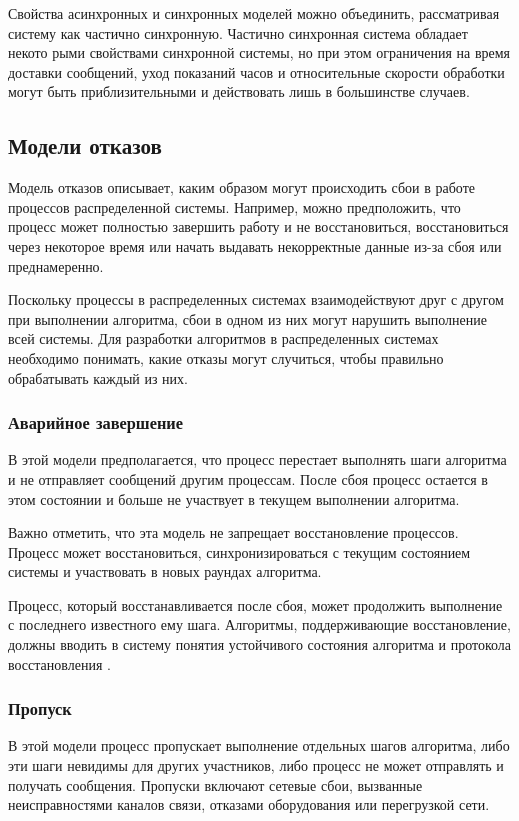 Свойства асинхронных и синхронных моделей можно объединить, рассматривая
систему как частично синхронную. Частично синхронная система обладает некото­
рыми свойствами синхронной системы, но при этом ограничения на время доставки
сообщений, уход показаний часов и относительные скорости обработки могут быть
приблизительными и действовать лишь в большинстве случаев.

\subsection{Модели отказов}

Модель отказов описывает, каким образом могут происходить сбои в работе
процессов распределенной системы. Например, можно предположить, что процесс
может полностью завершить работу и не восстановиться, восстановиться через
некоторое время или начать выдавать некорректные данные из-за сбоя или
преднамеренно.

Поскольку процессы в распределенных системах взаимодействуют друг с другом
при выполнении алгоритма, сбои в одном из них могут нарушить выполнение всей
системы. Для разработки алгоритмов в распределенных системах необходимо понимать,
какие отказы могут случиться, чтобы правильно обрабатывать каждый из них.

\subsubsection*{Аварийное завершение}

В этой модели предполагается, что процесс перестает выполнять шаги алгоритма
и не отправляет сообщений другим процессам. После сбоя процесс остается в этом
состоянии и больше не участвует в текущем выполнении алгоритма.

Важно отметить, что эта модель не запрещает восстановление процессов. Процесс
может восстановиться, синхронизироваться с текущим состоянием системы и
участвовать в новых раундах алгоритма.

Процесс, который восстанавливается после сбоя, может продолжить выполнение с
последнего известного ему шага. Алгоритмы, поддерживающие восстановление,
должны вводить в систему понятия устойчивого состояния алгоритма и протокола
восстановления \cite{skeen83}.

\subsubsection*{Пропуск}

В этой модели процесс пропускает выполнение отдельных шагов алгоритма, либо
эти шаги невидимы для других участников, либо процесс не может отправлять и
получать сообщения. Пропуски включают сетевые сбои, вызванные неисправностями
каналов связи, отказами оборудования или перегрузкой сети.

